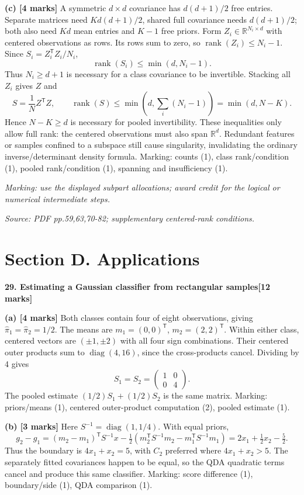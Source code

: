 \documentclass[11pt,a4paper]{article}
\begin{document}
\textbf{(c) [4 marks]} A symmetric \(d\times d\) covariance has \(d(d+1)/2\) free entries. Separate matrices need \(Kd(d+1)/2\), shared full covariance needs \(d(d+1)/2\); both also need \(Kd\) mean entries and \(K-1\) free priors. Form \(Z_i\in\mathbb R^{N_i\times d}\) with centered observations as rows. Its rows sum to zero, so \(\operatorname{rank}(Z_i)\le N_i-1\). Since \(S_i=Z_i^\mathsf TZ_i/N_i\),
\[
\operatorname{rank}(S_i)\le\min(d,N_i-1).
\]
Thus \(N_i\ge d+1\) is necessary for a class covariance to be invertible. Stacking all \(Z_i\) gives \(Z\) and
\[
S=\frac1N Z^\mathsf TZ,\qquad
\operatorname{rank}(S)\le\min\!\left(d,\sum_i(N_i-1)\right)=\min(d,N-K).
\]
Hence \(N-K\ge d\) is necessary for pooled invertibility. These inequalities only allow full rank: the centered observations must also span \(\mathbb R^d\). Redundant features or samples confined to a subspace still cause singularity, invalidating the ordinary inverse/determinant density formula. Marking: counts (1), class rank/condition (1), pooled rank/condition (1), spanning and insufficiency (1).

\textit{Marking: use the displayed subpart allocations; award credit for the logical or numerical intermediate steps.}\par
{\footnotesize\textit{Source: PDF pp.59,63,70-82; supplementary centered-rank conditions.}}
\newpage\section*{Section D. Applications}
\textbf{29. Estimating a Gaussian classifier from rectangular samples}\hfill\textbf{[12 marks]}\par\medskip
\textbf{(a) [4 marks]} Both classes contain four of eight observations, giving \(\hat\pi_1=\hat\pi_2=1/2\). The means are \(m_1=(0,0)^\mathsf T\), \(m_2=(2,2)^\mathsf T\). Within either class, centered vectors are \((\pm1,\pm2)\) with all four sign combinations. Their centered outer products sum to \(\operatorname{diag}(4,16)\), since the cross-products cancel. Dividing by 4 gives
\[
S_1=S_2=\begin{pmatrix}1&0\\0&4\end{pmatrix}.
\]
The pooled estimate \((1/2)S_1+(1/2)S_2\) is the same matrix. Marking: priors/means (1), centered outer-product computation (2), pooled estimate (1).

\textbf{(b) [3 marks]} Here \(S^{-1}=\operatorname{diag}(1,1/4)\). With equal priors,
\[
g_2-g_1=(m_2-m_1)^\mathsf TS^{-1}x
-\tfrac12(m_2^\mathsf TS^{-1}m_2-m_1^\mathsf TS^{-1}m_1)
=2x_1+\tfrac12x_2-\tfrac52.
\]
Thus the boundary is \(4x_1+x_2=5\), with \(C_2\) preferred where \(4x_1+x_2>5\). The separately fitted covariances happen to be equal, so the QDA quadratic terms cancel and produce this same classifier. Marking: score difference (1), boundary/side (1), QDA comparison (1).
\end{document}
